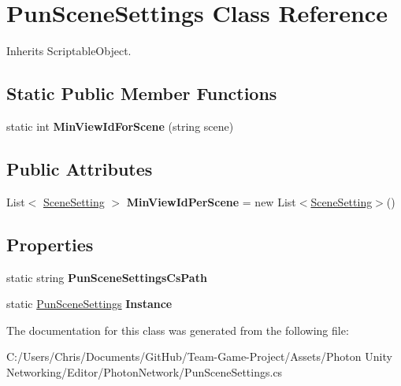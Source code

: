 \hypertarget{class_pun_scene_settings}{}\section{Pun\+Scene\+Settings Class Reference}
\label{class_pun_scene_settings}


Inherits Scriptable\+Object.

\subsection*{Static Public Member Functions}
\begin{DoxyCompactItemize}
\item 
static int {\bfseries Min\+View\+Id\+For\+Scene} (string scene)\hypertarget{class_pun_scene_settings_aa5344480f6e9b7ce76a2e9c235f630ed}{}\label{class_pun_scene_settings_aa5344480f6e9b7ce76a2e9c235f630ed}

\end{DoxyCompactItemize}
\subsection*{Public Attributes}
\begin{DoxyCompactItemize}
\item 
List$<$ \hyperlink{class_scene_setting}{Scene\+Setting} $>$ {\bfseries Min\+View\+Id\+Per\+Scene} = new List$<$\hyperlink{class_scene_setting}{Scene\+Setting}$>$()\hypertarget{class_pun_scene_settings_a827df7e0b56751a37d18179786954462}{}\label{class_pun_scene_settings_a827df7e0b56751a37d18179786954462}

\end{DoxyCompactItemize}
\subsection*{Properties}
\begin{DoxyCompactItemize}
\item 
static string {\bfseries Pun\+Scene\+Settings\+Cs\+Path}\hypertarget{class_pun_scene_settings_a96a96fc88a6e8b6919d04f833b7e0cb3}{}\label{class_pun_scene_settings_a96a96fc88a6e8b6919d04f833b7e0cb3}

\item 
static \hyperlink{class_pun_scene_settings}{Pun\+Scene\+Settings} {\bfseries Instance}\hypertarget{class_pun_scene_settings_a50bf111c9a9fd6daa6c4ab9082004932}{}\label{class_pun_scene_settings_a50bf111c9a9fd6daa6c4ab9082004932}

\end{DoxyCompactItemize}


The documentation for this class was generated from the following file\+:\begin{DoxyCompactItemize}
\item 
C\+:/\+Users/\+Chris/\+Documents/\+Git\+Hub/\+Team-\/\+Game-\/\+Project/\+Assets/\+Photon Unity Networking/\+Editor/\+Photon\+Network/Pun\+Scene\+Settings.\+cs\end{DoxyCompactItemize}
